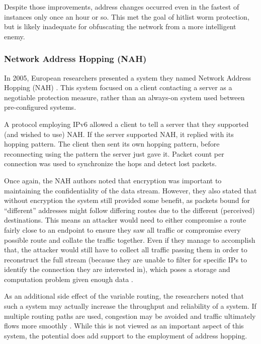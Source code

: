 \par Despite those improvements, address changes occurred even in the fastest of instances only once an hour or so. This met the goal of hitlist worm protection, but is likely inadequate for obfuscating the network from a more intelligent enemy.

\subsubsection{Network Address Hopping (NAH)}
\par In 2005, European researchers presented a system they named Network Address Hopping (NAH) \cite{NAH}. This system focused on a client contacting a server as a negotiable protection measure, rather than an always-on system used between pre-configured systems.

\par A protocol employing \ac{IPv6} allowed a client to tell a server that they supported (and wished to use) NAH. If the server supported NAH, it replied with its hopping pattern. The client then sent its own hopping pattern, before reconnecting using the pattern the server just gave it. Packet count per connection was used to synchronize the hops and detect lost packets.

\par Once again, the NAH authors noted that encryption was important to maintaining the confidentiality of the data stream. However, they also stated that without encryption the system still provided some benefit, as packets bound for ``different'' addresses might follow differing routes due to the different (perceived) destinations. This means an attacker would need to either compromise a route fairly close to an endpoint to ensure they saw all traffic or compromise every possible route and collate the traffic together. Even if they manage to accomplish that, the attacker would still have to collect all traffic passing them in order to reconstruct the full stream (because they are unable to filter for specific IPs to identify the connection they are interested in), which poses a storage and computation problem given enough data \cite{NAH}.

\par As an additional side effect of the variable routing, the researchers noted that such a system may actually increase the throughput and reliability of a system. If multiple routing paths are used, congestion may be avoided and traffic ultimately flows more smoothly \cite{MultimediaDistributed}. While this is not viewed as an important aspect of this system, the potential does add support to the employment of address hopping.

